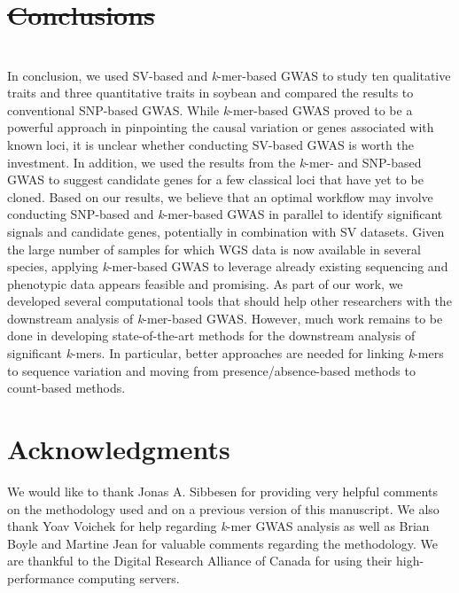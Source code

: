 \documentclass{article}
\providecommand{\DIFaddtex}[1]{{\protect\color{blue}\uwave{#1}}} %
\providecommand{\DIFdeltex}[1]{{\protect\color{red}\sout{#1}}}                      %
\providecommand{\DIFaddbegin}{} %
\providecommand{\DIFaddend}{} %
\providecommand{\DIFdelbegin}{} %
\providecommand{\DIFdelend}{} %
\providecommand{\DIFadd}[1]{\texorpdfstring{\DIFaddtex{#1}}{#1}} %
\providecommand{\DIFdel}[1]{\texorpdfstring{\DIFdeltex{#1}}{}} %
\newcommand{\DIFscaledelfig}{0.5}
\newlength{\DIFdelgraphicswidth} %
\newlength{\DIFdelgraphicsheight} %
\newcommand{\DIFaddincludegraphics}[2][]{{\color{blue}\fbox{\DIFOincludegraphics[#1]{#2}}}} %
\newcommand{\DIFdelincludegraphics}[2][]{%
\sbox{\DIFdelgraphicsbox}{\DIFOincludegraphics[#1]{#2}}%
\settoboxwidth{\DIFdelgraphicswidth}{\DIFdelgraphicsbox} %
\settoboxtotalheight{\DIFdelgraphicsheight}{\DIFdelgraphicsbox} %
\scalebox{\DIFscaledelfig}{%
\parbox[b]{\DIFdelgraphicswidth}{\usebox{\DIFdelgraphicsbox}\\[-\baselineskip] \rule{\DIFdelgraphicswidth}{0em}}\llap{\resizebox{\DIFdelgraphicswidth}{\DIFdelgraphicsheight}{%
\setlength{\unitlength}{\DIFdelgraphicswidth}%
\begin{picture}(1,1)%
\thicklines\linethickness{2pt} %
{\color[rgb]{1,0,0}\put(0,0){\framebox(1,1){}}}%
{\color[rgb]{1,0,0}\put(0,0){\line( 1,1){1}}}%
{\color[rgb]{1,0,0}\put(0,1){\line(1,-1){1}}}%
\end{picture}%
}\hspace*{3pt}}} %
} %
\DeclareRobustCommand{\DIFaddbegin}{\DIFOaddbegin \let\includegraphics\DIFaddincludegraphics} %
\DeclareRobustCommand{\DIFaddend}{\DIFOaddend \let\includegraphics\DIFOincludegraphics} %
\DeclareRobustCommand{\DIFdelbegin}{\DIFOdelbegin \let\includegraphics\DIFdelincludegraphics} %
\DeclareRobustCommand{\DIFdelend}{\DIFOaddend \let\includegraphics\DIFOincludegraphics} %
\begin{document}
\clearpage

\DIFdelbegin \section*{\DIFdel{Conclusions}}
\DIFdelend \DIFaddbegin \section{\DIFadd{Conclusions}}
\DIFaddend 

In conclusion, we used SV-based and \emph{k}-mer-based GWAS to study ten
qualitative traits and three quantitative traits in soybean and
compared the results to conventional SNP-based GWAS. While \emph{k}-mer-based
GWAS proved to be a powerful approach in pinpointing the causal variation or
genes associated with known loci, it is unclear whether conducting SV-based
GWAS is worth the investment. In addition, we used the results from the
\emph{k}-mer- and SNP-based GWAS to suggest candidate genes for a few classical
loci that have yet to be cloned. Based on our results, we believe that an
optimal workflow may involve conducting SNP-based and \emph{k}-mer-based GWAS
in parallel to identify significant signals and candidate genes, potentially in
combination with SV datasets. Given the large number of samples for which WGS
data is now available in several species, applying \emph{k}-mer-based GWAS to
leverage already existing sequencing and phenotypic data appears feasible and
promising.  As part of our work, we developed several computational tools that
should help other researchers with the downstream analysis of
\emph{k}-mer-based GWAS. However, much work remains to be done in
developing state-of-the-art methods for the downstream analysis of significant
\emph{k}-mers. In particular, better approaches are needed for linking
\emph{k}-mers to sequence variation and moving from presence/absence-based
methods to count-based methods.

\clearpage

\section*{Acknowledgments}

We would like to thank Jonas A. Sibbesen for providing very helpful comments
on the methodology used and on a previous version of this manuscript.
We also thank Yoav Voichek for help regarding \textit{k}-mer GWAS
analysis as well as Brian Boyle and Martine Jean for valuable comments
regarding the methodology. We are thankful to the Digital Research Alliance of
Canada for using their high-performance computing servers.
\end{document}
